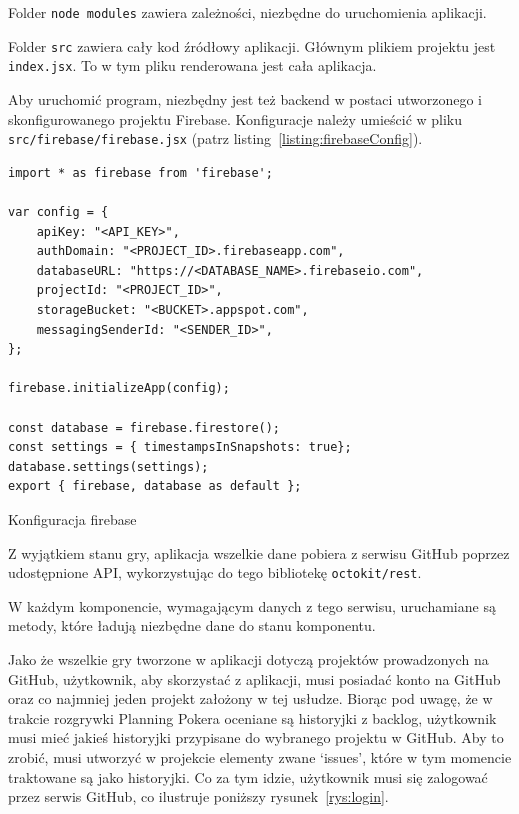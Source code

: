 Folder \texttt{node modules} zawiera zależności, niezbędne do uruchomienia aplikacji.

Folder \texttt{src} zawiera cały kod źródłowy aplikacji.
Głównym plikiem projektu jest \texttt{index.jsx}. To w tym pliku renderowana jest cała aplikacja.

Aby uruchomić program,
niezbędny jest też backend w postaci utworzonego i skonfigurowanego projektu Firebase.
Konfiguracje należy umieścić w pliku \texttt{src/firebase/firebase.jsx}
(patrz listing~\ref{listing:firebaseConfig}).

\begin{listing}
\begin{verbatim}
import * as firebase from 'firebase';

var config = {
    apiKey: "<API_KEY>",
    authDomain: "<PROJECT_ID>.firebaseapp.com",
    databaseURL: "https://<DATABASE_NAME>.firebaseio.com",
    projectId: "<PROJECT_ID>",
    storageBucket: "<BUCKET>.appspot.com",
    messagingSenderId: "<SENDER_ID>",
};

firebase.initializeApp(config);

const database = firebase.firestore();
const settings = { timestampsInSnapshots: true};
database.settings(settings);
export { firebase, database as default };
\end{verbatim}
\caption{Konfiguracja firebase}\label{listing:firebaseConfig}
\end{listing}

Z wyjątkiem stanu gry, aplikacja wszelkie dane pobiera z serwisu GitHub poprzez
udostępnione API, wykorzystując do tego bibliotekę \texttt{octokit/rest}.

W każdym komponencie, wymagającym danych z tego serwisu,
uruchamiane są metody, które ładują niezbędne dane do stanu komponentu.

Jako że wszelkie gry tworzone w aplikacji dotyczą projektów prowadzonych na GitHub,
użytkownik, aby skorzystać z aplikacji, musi posiadać konto na GitHub oraz co najmniej
jeden projekt założony w tej usłudze.
Biorąc pod uwagę, że w trakcie rozgrywki Planning Pokera oceniane są historyjki z backlog,
użytkownik musi mieć jakieś historyjki przypisane do wybranego projektu w GitHub.
Aby to zrobić, musi utworzyć w projekcie elementy zwane `issues', które w tym momencie traktowane są jako historyjki.
Co za tym idzie, użytkownik musi się zalogować przez serwis GitHub, co ilustruje poniższy rysunek~\ref{rys:login}.


